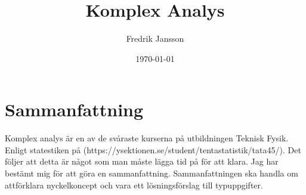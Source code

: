 \documentclass{article}
\author{Fredrik Jansson}
\date{\today}
\title{Komplex Analys}
\begin{document}
\maketitle

\section*{Sammanfattning}
Komplex analys är en av de svåraste kurserna på utbildningen Teknisk Fysik. Enligt statestiken på (https://ysektionen.se/student/tentastatistik/tata45/). Det följer att detta är något som man måste lägga tid på för att klara. Jag har bestämt mig för att göra en sammanfattning. Sammanfattningen ska handla om attförklara nyckelkoncept och vara ett lösningsförslag till typuppgifter. 







\end{document}
